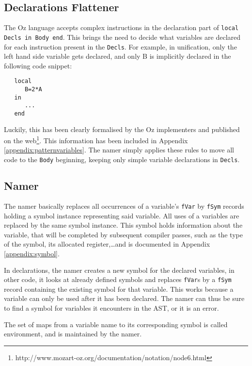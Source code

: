 \documentclass[a4paper]{memoir}
\begin{document}
\subsection{Declarations Flattener}\label{sec:arch:declsflattener}
The Oz language accepts complex instructions in the declaration part of \lstinline!local Decls in Body end!. This brings the need to decide what variables are declared for each instruction present in the \lstinline!Decls!. 
For example, in unification, only the left hand side variable gets declared, and only B is implicitly declared in the following code snippet:
\begin{lstlisting}
   local
      B=2*A
   in
      ...
   end
\end{lstlisting}
Luckily, this has been clearly formalised by the Oz implementers and published on the web\footnote[]{http://www.mozart-oz.org/documentation/notation/node6.html}. This information has been included in Appendix \ref{appendix:patternvariables}. The namer simply applies these rules to move all code to the \lstinline!Body! beginning, keeping only simple variable declarations in \lstinline!Decls!.

\subsection{Namer}\label{sec:arch:namer}
The namer  basically replaces all occurrences of a variable's \lstinline!fVar! by \lstinline!fSym! records holding a symbol instance representing said variable. All uses of a variables are replaced by the same symbol instance. This symbol holds information about the variable, that will be completed by subsequent compiler passes, such as the type of the symbol, its allocated register,\ldots and is documented in Appendix \ref{appendix:symbol}.

In declarations, the namer creates a new symbol for the declared variables, in other code, it looks at already defined symbols and replaces \lstinline!fVar!s by a \lstinline!fSym! record containing the existing symbol for that variable. This works because a variable can only be used after it has been declared. The namer can thus be sure to find a symbol for variables it encounters in the AST, or it is an error.

The set of maps from a variable name to its corresponding symbol is called environment, and is maintained by the namer.
\end{document}
